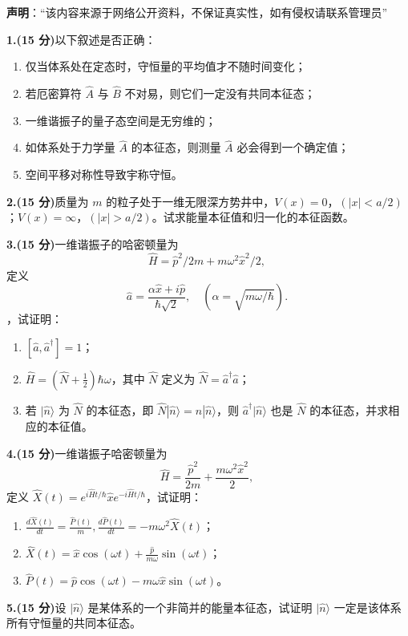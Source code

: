 
\textbf{声明}：“该内容来源于网络公开资料，不保证真实性，如有侵权请联系管理员”

\textbf{1.(15 分)}以下叙述是否正确：

\begin{enumerate}
    \item  仅当体系处在定态时，守恒量的平均值才不随时间变化；
    \item  若厄密算符 $\hat{A}$ 与 $\hat{B}$ 不对易，则它们一定没有共同本征态；
    \item  一维谐振子的量子态空间是无穷维的；
    \item  如体系处于力学量 $\hat{A}$ 的本征态，则测量 $\hat{A}$ 必会得到一个确定值；
    \item  空间平移对称性导致宇称守恒。
\end{enumerate}

\textbf{2.(15 分)}质量为 $m$ 的粒子处于一维无限深方势井中，$V(x) = 0$，$(|x| < a/2)$；$V(x) = \infty$，$(|x| > a/2)$。试求能量本征值和归一化的本征函数。

\textbf{3.(15 分)}一维谐振子的哈密顿量为 
$$\hat{H} = \hat{p}^2/2m + m\omega^2 \hat{x}^2/2,~$$ 
定义
$$\hat{a} = \frac{\alpha \hat{x} + i \hat{p}}{\hbar \sqrt{2}}, \quad (\alpha = \sqrt{m \omega / \hbar}).~$$，试证明：
\begin{enumerate}
    \item  $[\hat{a}, \hat{a}^\dagger] = 1$；
    \item  $\hat{H} = (\hat{N} + \frac{1}{2})\hbar \omega$，其中 $\hat{N}$ 定义为 $\hat{N} = \hat{a}^\dagger \hat{a}$；
    \item  若 $|\hat{n}\rangle$ 为 $\hat{N}$ 的本征态，即 $\hat{N}|\hat{n}\rangle = n|\hat{n}\rangle$，则 $\hat{a}^\dagger|\hat{n}\rangle$ 也是 $\hat{N}$ 的本征态，并求相应的本征值。
\end{enumerate}

\textbf{4.(15 分)}一维谐振子哈密顿量为 
$$\hat{H} = \frac{\hat{p}^2}{2m} + \frac{m\omega^2 \hat{x}^2}{2},~$$ 
定义 $\hat{X}(t) = e^{i\hat{H}t/\hbar} \hat{x} e^{-i\hat{H}t/\hbar}$，试证明：
\begin{enumerate}
    \item  $\frac{d\hat{X}(t)}{dt} = \frac{\hat{P}(t)}{m}, \frac{d\hat{P}(t)}{dt} = -m\omega^2 \hat{X}(t)$；
    \item  $\hat{X}(t) = \hat{x} \cos(\omega t) + \frac{\hat{p}}{m\omega} \sin(\omega t)$；
    \item  $\hat{P}(t) = \hat{p} \cos(\omega t) - m\omega \hat{x} \sin(\omega t)$。
\end{enumerate}

\textbf{5.(15 分)}设 $|\hat{n}\rangle$ 是某体系的一个非简并的能量本征态，试证明 $|\hat{n}\rangle$ 一定是该体系所有守恒量的共同本征态。